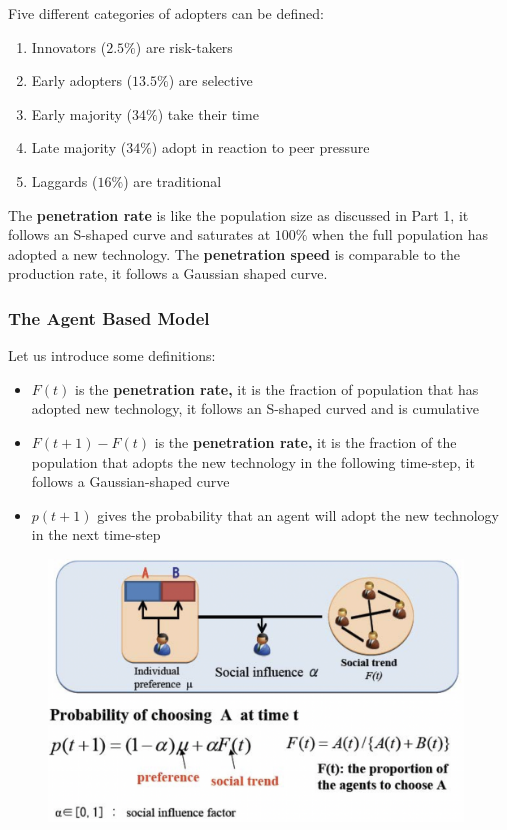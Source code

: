 \documentclass[a4paper]{extarticle}
\begin{document}
Five different categories of adopters can be defined:

\begin{enumerate}
    \item Innovators ($2.5\%$) are risk-takers
    \item Early adopters ($13.5\%$) are selective
    \item Early majority ($34\%$) take their time
    \item Late majority ($34\%$) adopt in reaction to peer pressure
    \item Laggards ($16\%$) are traditional
\end{enumerate}

The \textbf{penetration rate} is like the population size as discussed in Part 1, it follows an S-shaped curve and saturates at $100\%$ when the full population has adopted a new technology. The \textbf{penetration speed} is comparable to the production rate, it follows a Gaussian shaped curve.

\subsubsection{The Agent Based Model}

Let us introduce some definitions:

\begin{itemize}
    \item $F(t)$ is the \textbf{penetration rate,} it is the fraction of population that has adopted new technology, it follows an S-shaped curved and is cumulative
    \item $F(t + 1) - F(t)$ is the \textbf{penetration rate,} it is the fraction of the population that adopts the new technology in the following time-step, it follows a Gaussian-shaped curve
    \item $p(t + 1)$ gives the probability that an agent will adopt the new technology in the next time-step
\end{itemize}

\begin{figure}[H]
    \includegraphics[width=11cm]{../images/EnpRisk_Fig7-1}
    \centering
\end{figure}
\end{document}
